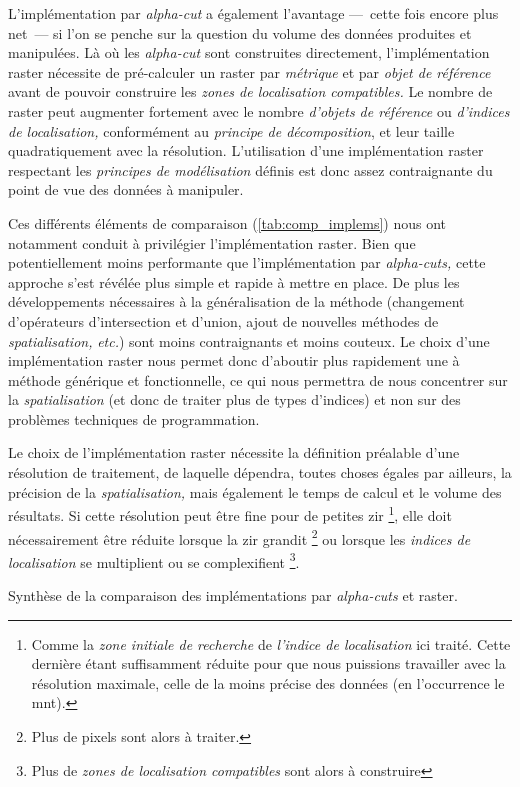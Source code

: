 L'implémentation par \emph{alpha-cut} a également l'avantage ---~cette
fois encore plus net~--- si l'on se penche sur la question du volume
des données produites et manipulées. Là où les \emph{alpha-cut} sont
construites directement, l'implémentation raster nécessite de
pré-calculer un raster par \emph{métrique} et par \emph{objet de
  référence} avant de pouvoir construire les \emph{zones de
  localisation compatibles.} Le nombre de raster peut augmenter
fortement avec le nombre \emph{d'objets de référence} ou
\emph{d'indices de localisation,} conformément au \emph{principe de
  décomposition}, et leur taille quadratiquement avec la
résolution. L'utilisation d'une implémentation raster respectant les
\emph{principes de modélisation} définis est donc assez contraignante
du point de vue des données à manipuler.

Ces différents éléments de comparaison (\autoref{tab:comp_implems})
nous ont notamment conduit à privilégier l'implémentation raster. Bien
que potentiellement moins performante que l'implémentation par
\emph{alpha-cuts,} cette approche s'est révélée plus simple et rapide
à mettre en place. De plus les développements nécessaires à la
généralisation de la méthode (\eg changement d'opérateurs
d'intersection et d'union, ajout de nouvelles méthodes de
\emph{spatialisation,} \emph{etc.}) sont moins contraignants et moins
couteux. Le choix d'une implémentation raster nous permet donc
d'aboutir plus rapidement une à méthode générique et fonctionnelle, ce
qui nous permettra de nous concentrer sur la \emph{spatialisation} (et
donc de traiter plus de types d'indices) et non sur des problèmes
techniques de programmation.

Le choix de l'implémentation raster nécessite la définition préalable
d'une résolution de traitement, de laquelle dépendra, toutes choses
égales par ailleurs, la précision de la \emph{spatialisation,} mais
également le temps de calcul et le volume des résultats. Si cette
résolution peut être fine pour de petites \ac{zir} \footnote{Comme la
  \emph{zone initiale de recherche} de \emph{l'indice de localisation}
  ici traité. Cette dernière étant suffisamment réduite pour que nous
  puissions travailler avec la résolution maximale, celle de la moins
  précise des données (en l’occurrence le \ac{mnt}).}, elle doit
nécessairement être réduite lorsque la \ac{zir} grandit \footnote{Plus
  de pixels sont alors à traiter.} ou lorsque les \emph{indices de
  localisation} se multiplient ou se complexifient \footnote{Plus de
  \emph{zones de localisation compatibles} sont alors à construire}.

\begin{landscape}
  \begin{table}[!h]
    \centering
    
    \caption{Synthèse de la comparaison des implémentations par
      \emph{alpha-cuts} et raster.}
    \label{tab:comp_implems}
  \end{table}
\end{landscape}

